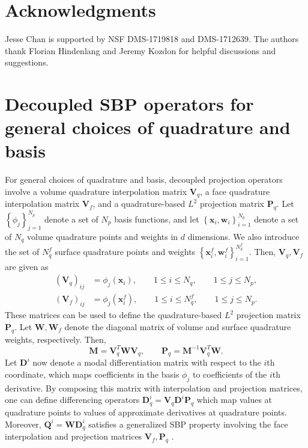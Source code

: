 \documentclass[review,onefignum,onetabnum,final]{siamart171218}
\newcommand{\LRp}[1]{\left( #1 \right)}
\newcommand{\LRc}[1]{\left\{ #1 \right\}}
\newcommand{\note}[1]{{\color{blue}{#1}}}
\begin{document}

\section{Acknowledgments}

Jesse Chan is supported by NSF DMS-1719818 and DMS-1712639.  The authors thank Florian Hindenlang and Jeremy Kozdon for helpful discussions and suggestions.

\appendix

\section{Decoupled SBP operators for general choices of quadrature and basis}
\label{app:decoupled}

For general choices of quadrature and basis, decoupled projection operators involve a volume quadrature interpolation matrix $\bm{V}_q$, a face quadrature interpolation matrix $\bm{V}_f$, and a quadrature-based $L^2$ projection matrix $\bm{P}_q$.  Let $\LRc{\phi_j}_{j=1}^{N_p}$ denote a set of $N_p$ basis functions, and let $\LRc{\bm{x}_i, \bm{w}_i}_{i = 1}^{N_q}$ denote a set of $N_q$ volume quadrature points and weights in $d$ dimensions.  We also introduce the set of $N^f_q$ surface quadrature points and weights $\LRc{\bm{x}^f_i, \bm{w}^f_i}_{i=1}^{N^f_q}$.  
Then, $\bm{V}_q, \bm{V}_f$ are given as 
\begin{align*}
\LRp{\bm{V}_q}_{ij} &= \phi_j(\bm{x}_i), \qquad 1 \leq i \leq N_q, \qquad 1 \leq j \leq N_p,\\
\LRp{\bm{V}_f}_{ij} &= \phi_j\LRp{\bm{x}^f_i}, \qquad 1 \leq i \leq N^f_q, \qquad 1\leq j \leq N_p.
\end{align*}
These matrices can be used to define the quadrature-based $L^2$ projection matrix $\bm{P}_q$.  Let $\bm{W}, \bm{W}_f$ denote the diagonal matrix of volume and surface quadrature weights, respectively.  Then, 
\[
\bm{M} = \bm{V}_q^T\bm{W}\bm{V}_q, \qquad \bm{P}_q = \bm{M}^{-1}\bm{V}_q^T\bm{W}.  
\]
Let $\bm{D}^i$ now denote a modal differentiation matrix with respect to the $i$th coordinate, which maps coefficients in the basis $\phi_j$ to coefficients of the $i$th derivative.  By composing this matrix with interpolation and projection matrices, one can define differencing operators $\bm{D}_q^i = \bm{V}_q\bm{D}^i\bm{P}_q$ which map values at quadrature points to values of approximate derivatives at quadrature points.  Moreover, $\bm{Q}^i = \bm{W}\bm{D}_q^i$ satisfies a generalized SBP property involving the face interpolation and projection matrices $\bm{V}_f, \bm{P}_q$ \cite{chan2017discretely}.  
\end{document}
